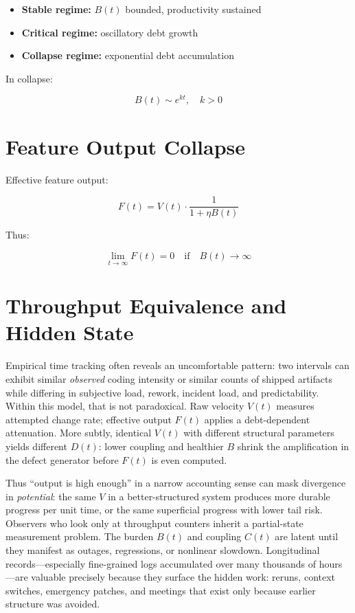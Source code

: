 \documentclass[11pt]{article}
\begin{document}
\begin{itemize}
    \item \textbf{Stable regime:} $B(t)$ bounded, productivity sustained
    \item \textbf{Critical regime:} oscillatory debt growth
    \item \textbf{Collapse regime:} exponential debt accumulation
\end{itemize}

In collapse:

\begin{equation}
B(t) \sim e^{kt}, \quad k > 0
\end{equation}

\section{Feature Output Collapse}

Effective feature output:

\begin{equation}
F(t) = V(t) \cdot \frac{1}{1 + \eta B(t)}
\end{equation}

Thus:

\begin{equation}
\lim_{t \to \infty} F(t) = 0 \quad \text{if} \quad B(t) \to \infty
\end{equation}

\section{Throughput Equivalence and Hidden State}

Empirical time tracking often reveals an uncomfortable pattern: two intervals can exhibit similar \emph{observed} coding intensity or similar counts of shipped artifacts while differing in subjective load, rework, incident load, and predictability. Within this model, that is not paradoxical. Raw velocity $V(t)$ measures attempted change rate; effective output $F(t)$ applies a debt-dependent attenuation. More subtly, identical $V(t)$ with different structural parameters yields different $D(t)$: lower coupling and healthier $B$ shrink the amplification in the defect generator before $F(t)$ is even computed.

Thus ``output is high enough'' in a narrow accounting sense can mask divergence in \emph{potential}: the same $V$ in a better-structured system produces more durable progress per unit time, or the same superficial progress with lower tail risk. Observers who look only at throughput counters inherit a partial-state measurement problem. The burden $B(t)$ and coupling $C(t)$ are latent until they manifest as outages, regressions, or nonlinear slowdown. Longitudinal records---especially fine-grained logs accumulated over many thousands of hours---are valuable precisely because they surface the hidden work: reruns, context switches, emergency patches, and meetings that exist only because earlier structure was avoided.
\end{document}
